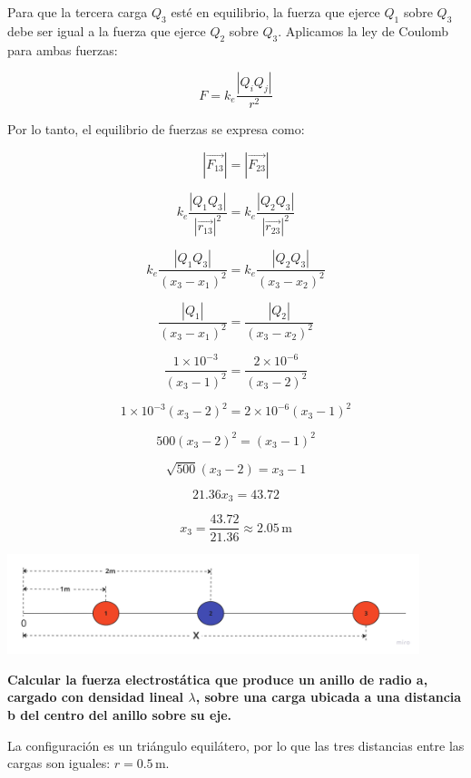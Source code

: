 \documentclass[answers]{exam} %
\begin{document}
\begin{questions}
\begin{multicols}{2}
		Para que la tercera carga \( Q_3 \) esté en equilibrio, la fuerza que ejerce \( Q_1 \) sobre \( Q_3 \) debe ser igual a la fuerza que ejerce \( Q_2 \) sobre \( Q_3 \). Aplicamos la ley de Coulomb para ambas fuerzas:

		\[
			F = k_e \frac{|Q_i Q_j|}{r^2}
		\]

		Por lo tanto, el equilibrio de fuerzas se expresa como:

		\[
			|\vec{F_{13}}| = |\vec{F_{23}}|
		\]

		\[
			k_e \dfrac{|Q_1 Q_3|}{|\vec{r_{13}}|^2} = k_e \dfrac{|Q_2 Q_3|}{|\vec{r_{23}}|^2}
		\]

		\[
			k_e \dfrac{|Q_1 Q_3|}{(x_3 - x_1)^2} = k_e \dfrac{|Q_2 Q_3|}{(x_3 - x_2)^2}
		\]

		\[
			\frac{|Q_1|}{(x_3 - x_1)^2} = \frac{|Q_2|}{(x_3 - x_2)^2}
		\]

		\[
			\frac{1 \times 10^{-3}}{(x_3 - 1)^2} = \frac{2 \times 10^{-6}}{(x_3 - 2)^2}
		\]

		\[
			1 \times 10^{-3} (x_3 - 2)^2 = 2 \times 10^{-6} (x_3 - 1)^2
		\]


		\[
			500 (x_3 - 2)^2 = (x_3 - 1)^2
		\]

		\[
			\sqrt{500} (x_3 - 2) = x_3 - 1
		\]

		\[
			21.36 x_3 = 43.72
		\]

		\[
			x_3 = \frac{43.72}{21.36} \approx 2.05 \, \text{m}
		\]
	\end{multicols}

	\vspace{0.5cm}

	\begin{minipage}{\textwidth}
		\centering
		\includegraphics[width=0.9\textwidth]{public/g4.png}\\
	\end{minipage}

	\vspace{0.5cm}
	\newpage
	\question \large\textbf{Calcular la fuerza electrostática que produce un anillo de radio a, cargado con densidad lineal $\lambda$, sobre una carga ubicada a una distancia b del centro del anillo sobre su eje. }
	\begin{multicols}{2}
		La configuración es un triángulo equilátero, por lo que las tres distancias entre las cargas son iguales: \( r = 0.5 \, \text{m} \).


\end{multicols}
\end{questions}
\end{document}
